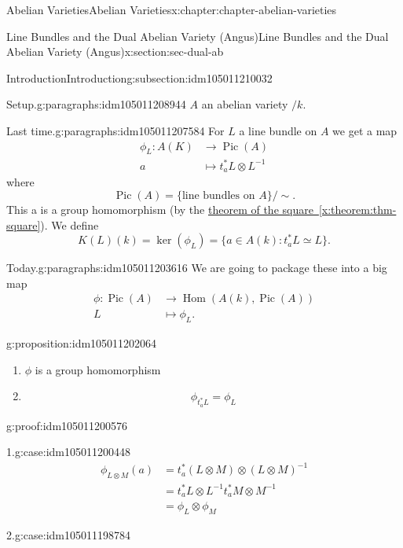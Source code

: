 \documentclass[oneside,10pt,]{book}
\numberwithin{equation}{section}
\DeclareMathOperator{\Hom}{Hom}
\DeclareMathOperator{\Pic}{Pic}
\newcommand{\amp}{&}
\begin{document}
\begin{chapterptx}{Abelian Varieties}{}{Abelian Varieties}{}{}{x:chapter:chapter-abelian-varieties}
\begin{sectionptx}{Line Bundles and the Dual Abelian Variety (Angus)}{}{Line Bundles and the Dual Abelian Variety (Angus)}{}{}{x:section:sec-dual-ab}
\begin{subsectionptx}{Introduction}{}{Introduction}{}{}{g:subsection:idm105011210032}
\begin{paragraphs}{Setup.}{g:paragraphs:idm105011208944}
\(A\) an abelian variety \(/k\).%
\end{paragraphs}%
\begin{paragraphs}{Last time.}{g:paragraphs:idm105011207584}%
For \(L\) a line bundle on \(A\) we get a map%
\begin{align*}
\phi_L\colon A(K) \amp\to \Pic(A)\\
a\amp\mapsto t_a^* L\otimes L^{-1}
\end{align*}
where%
\begin{equation*}
\Pic(A) = \{\text{line bundles on } A\}/\sim\text{.}
\end{equation*}
This a is a group homomorphism (by the \hyperref[x:theorem:thm-square]{theorem of the square~\ref{x:theorem:thm-square}}). We define%
\begin{equation*}
K(L)(k) = \ker(\phi_L) = \{a\in A(k) : t_a^* L \simeq L\}\text{.}
\end{equation*}
%
\end{paragraphs}%
\begin{paragraphs}{Today.}{g:paragraphs:idm105011203616}%
We are going to package these into a big map%
\begin{align*}
\phi\colon \Pic(A)\amp\to \Hom(A(k), \Pic(A))\\
L \amp\mapsto \phi_L\text{.}
\end{align*}
%
\begin{proposition}{}{}{g:proposition:idm105011202064}%
%
\begin{enumerate}
\item{}\(\phi\) is a group homomorphism%
\item{}%
\begin{equation*}
\phi_{t_a^* L}  = \phi_L
\end{equation*}
%
\end{enumerate}
%
\end{proposition}
\begin{proofptx}{}{g:proof:idm105011200576}
\begin{case}{}{1.}{g:case:idm105011200448}
%
\begin{align*}
\phi_{L\otimes M}(a) \amp = t_a^*(L\otimes M) \otimes(L\otimes M)^{-1}\\
\amp = t_a^*L\otimes L^{-1} t_a^*M\otimes M^{-1}\\
\amp = \phi_L\otimes \phi_M
\end{align*}
%
\end{case}
\begin{case}{}{2.}{g:case:idm105011198784}
%
\begin{align*}

\end{align*}
\end{case}
\end{proofptx}
\end{paragraphs}
\end{subsectionptx}
\end{sectionptx}
\end{chapterptx}
\end{document}
